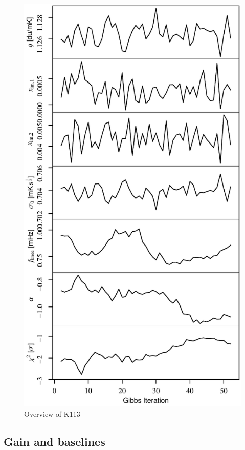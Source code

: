 \documentclass[twocolumn]{../../common/aa}
\begin{document}
\begin{figure}[t]
  	\centering
	\includegraphics[width=\linewidth]{figures/instpar_CG_K113_samples_v1.pdf}
	\caption{Overview of K113}
	\label{fig:inst_K113}
\end{figure}



\subsection{Gain and baselines}
\label{sec:gain}
\end{document}
